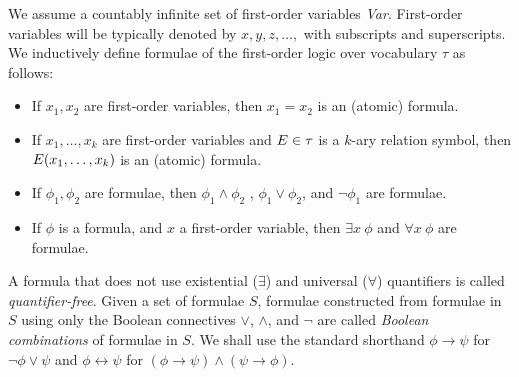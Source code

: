 \begin{definition}\label{FO}

We assume a countably infinite set of first-order variables {\em Var}.
First-order variables
will be typically denoted by $x, y, z, \ldots,$ with subscripts and superscripts.
We
inductively define %
formulae of the 
first-order
logic
over vocabulary $\tau$ as follows:

\begin{samepage}
\begin{itemize}
%
\item  If $x_1 , x_2$ are first-order variables, then $x_1 = x_2$ is an (atomic) formula.
\item  If $x_1 , \ldots , x_k$  are first-order variables and $E \in \tau$ is a $k$-ary relation symbol, then 
$E(x_1 , \ldots , x_k )$
is an (atomic) formula.
%
\item  If $ \phi_1 , \phi_2$ are formulae, then $\phi_1 \wedge \phi_2$ , $\phi_1 \vee \phi_2$, and 
$\neg \phi_1$ are formulae.
\item  If $\phi$  is a formula, and $x$ a first-order variable, then $\exists x ~ \phi$  and $\forall x ~ \phi$  are formulae.
\end{itemize}
\end{samepage}

\end{definition}




A formula that does not use existential ($\exists$) and universal ($\forall$) quantiﬁers
is called {\em quantifier-free}.
%
Given a set of formulae $S$, formulae constructed from formulae in $S$ using
only the Boolean connectives $\vee$, $\wedge$, and $\neg$ are called {\em Boolean combinations} of
formulae in $S$.
%
We shall use the standard shorthand $\phi  \to \psi $ for $ \neg \phi \vee \psi $ 
and $\phi \leftrightarrow \psi $ for
$(\phi  \to \psi ) \wedge (\psi  \to \phi )$. \\


